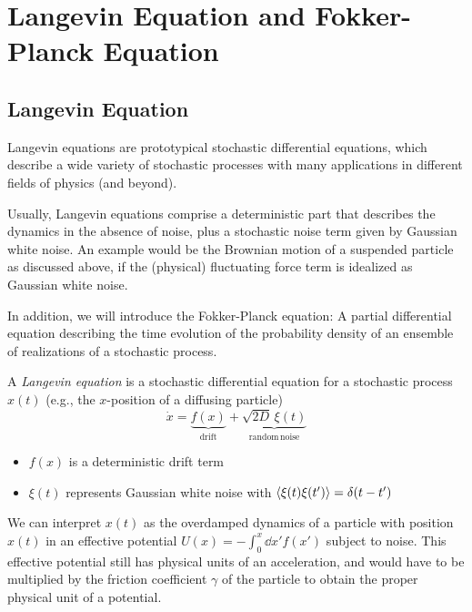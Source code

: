 \documentclass{notebook}
\begin{document}
\chapter{Langevin Equation and Fokker-Planck Equation}



\section{Langevin Equation}

Langevin equations are prototypical stochastic differential equations, which describe a wide variety of stochastic processes with many applications in different fields of physics (and beyond). 

Usually, Langevin equations comprise a deterministic part
that describes the dynamics in the absence of noise, 
plus a stochastic noise term given by Gaussian white noise.
An example would be the Brownian motion of a suspended particle as discussed above, if the (physical) fluctuating force term is idealized as Gaussian white noise.

In addition, we will introduce the Fokker-Planck equation: A partial differential equation describing the time evolution of the probability density of an ensemble of realizations of a stochastic process. 

\begin{theorem}
	A \textit{Langevin equation} is a stochastic differential equation for a stochastic process $x(t)$ (e.g., the $x$-position of a diffusing particle)
	\begin{equation}
		\dot{x} = \underbrace{f(x)}_{\mathrm{drift}} + \underbrace{\sqrt{2D} \, \xi(t)}_{\mathrm{random \, noise}}
		\label{langevin}
	\end{equation}
	\begin{itemize}
		\item $f(x)$ is a deterministic drift term
		\item $\xi(t)$ represents Gaussian white noise with $\expval{\xi(t)\xi(t')} = \delta(t-t')$	
		\end{itemize}
\end{theorem}

We can interpret $x(t)$ as the overdamped dynamics of a particle with position $x(t)$
in an effective potential $U(x) = - \int_0^{x}{\dd{x'} f(x')}$ subject to noise. This effective potential still has physical units of an acceleration, 
and would have to be multiplied by the friction coefficient $\gamma$ of the particle 
to obtain the proper physical unit of a potential.
\end{document}
